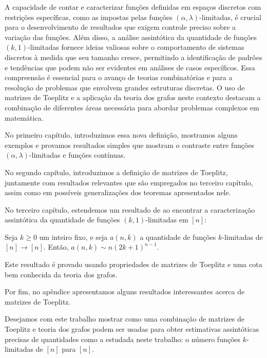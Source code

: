 A capacidade de contar e caracterizar funções definidas em espaços discretos com restrições específicas, como as impostas pelas funções $(\alpha,\lambda)$-limitadas, é crucial para o desenvolvimento de resultados que exigem controle preciso sobre a variação das funções. Além disso, a análise assintótica da quantidade de funções $(k,1)$-limitadas fornece ideias valiosas sobre o comportamento de sistemas discretos à medida que seu tamanho cresce, permitindo a identificação de padrões e tendências que podem não ser evidentes em análises de casos específicos. Essa compreensão é essencial para o avanço de teorias combinatórias e para a resolução de problemas que envolvem grandes estruturas discretas. O uso de matrizes de Toeplitz e a aplicação da teoria dos grafos neste contexto destacam a combinação de diferentes áreas necessária para abordar problemas complexos em matemática.

No primeiro capítulo, introduzimos essa nova definição, mostramos alguns exemplos e provamos resultados simples que mostram o contraste entre funções $(\alpha,\lambda)$-limitadas e funções contínuas.

No segundo capítulo, introduzimos a definição de matrizes de Toeplitz, juntamente com resultados relevantes que são empregados no terceiro capítulo, assim como em possíveis generalizações dos teoremas apresentados nele.

No terceiro capítulo, estendemos um resultado de \cite{coulson} ao encontrar a caracterização assintótica da quantidade de funções $(k,1)$-limitadas em $[n]$:

\begin{theorem*} Seja $k \ge 0$ um inteiro fixo, e seja $a(n, k)$ a quantidade de funções $k$-limitadas de $[n]\to[n]$. Então, $a(n,k) \sim n(2k+1)^{n-1}$. \end{theorem*}

Este resultado é provado usando propriedades de matrizes de Toeplitz e uma cota bem conhecida da teoria dos grafos.

Por fim, no apêndice apresentamos alguns resultados interessantes acerca de matrizes de Toeplitz.

Desejamos com este trabalho mostrar como uma combinação de matrizes de Toeplitz e teoria dos grafos podem ser usadas para obter estimativas assintóticas precisas de quantidades como a estudada neste trabalho: o número funções $k$-limitadas de $[n]$ para $[n]$.
